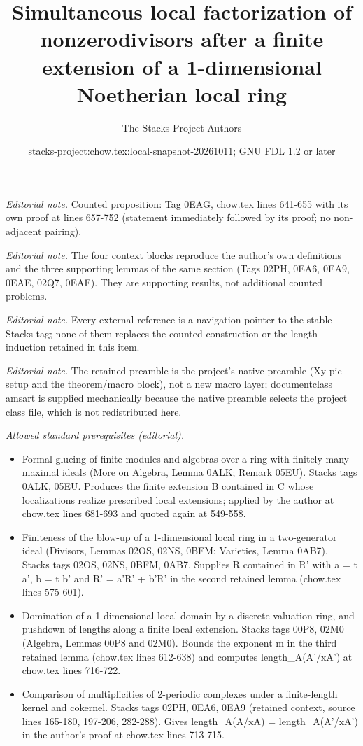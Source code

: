 \documentclass[10pt,a4paper]{amsart}
\title{Simultaneous local factorization of nonzerodivisors after a finite extension of a 1-dimensional Noetherian local ring}
\author{The Stacks Project Authors}
\date{stacks-project:chow.tex:local-snapshot-20261011; GNU FDL 1.2 or later}
\theoremstyle{plain}
\theoremstyle{definition}
\theoremstyle{remark}
\numberwithin{equation}{subsection}
\begin{document}
\maketitle
\noindent\textit{Editorial note.} Counted proposition: Tag 0EAG, chow.tex lines 641-655 with its own proof at lines 657-752 (statement immediately followed by its proof; no non-adjacent pairing).\par\medskip
\noindent\textit{Editorial note.} The four context blocks reproduce the author's own definitions and the three supporting lemmas of the same section (Tags 02PH, 0EA6, 0EA9, 0EAE, 02Q7, 0EAF). They are supporting results, not additional counted problems.\par\medskip
\noindent\textit{Editorial note.} Every external reference is a navigation pointer to the stable Stacks tag; none of them replaces the counted construction or the length induction retained in this item.\par\medskip
\noindent\textit{Editorial note.} The retained preamble is the project's native preamble (Xy-pic setup and the theorem/macro block), not a new macro layer; documentclass amsart is supplied mechanically because the native preamble selects the project class file, which is not redistributed here.\par\medskip
\noindent\textit{Allowed standard prerequisites (editorial).}\begin{itemize}
\item Formal glueing of finite modules and algebras over a ring with finitely many maximal ideals (More on Algebra, Lemma 0ALK; Remark 05EU). Stacks tags 0ALK, 05EU. Produces the finite extension B contained in C whose localizations realize prescribed local extensions; applied by the author at chow.tex lines 681-693 and quoted again at 549-558.
\item Finiteness of the blow-up of a 1-dimensional local ring in a two-generator ideal (Divisors, Lemmas 02OS, 02NS, 0BFM; Varieties, Lemma 0AB7). Stacks tags 02OS, 02NS, 0BFM, 0AB7. Supplies R contained in R' with a = t a', b = t b' and R' = a'R' + b'R' in the second retained lemma (chow.tex lines 575-601).
\item Domination of a 1-dimensional local domain by a discrete valuation ring, and pushdown of lengths along a finite local extension. Stacks tags 00P8, 02M0 (Algebra, Lemmas 00P8 and 02M0). Bounds the exponent m in the third retained lemma (chow.tex lines 612-638) and computes length\_A(A'/xA') at chow.tex lines 716-722.
\item Comparison of multiplicities of 2-periodic complexes under a finite-length kernel and cokernel. Stacks tags 02PH, 0EA6, 0EA9 (retained context, source lines 165-180, 197-206, 282-288). Gives length\_A(A/xA) = length\_A(A'/xA') in the author's proof at chow.tex lines 713-715.
\end{itemize}\medskip
\end{document}
